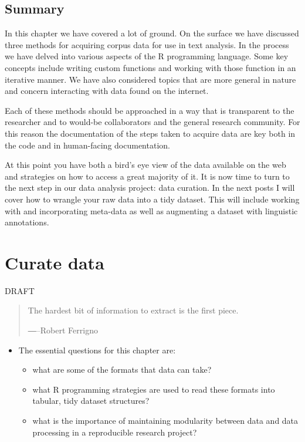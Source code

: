 \documentclass[
]{article}
\providecommand{\tightlist}{%
  \setlength{\itemsep}{0pt}\setlength{\parskip}{0pt}}
\newenvironment{rmdblock}[1]
  {\begin{shaded*}
  \begin{itemize}
  \renewcommand{\labelitemi}{
    \raisebox{-.5\height}[0pt][0pt]{
      {\setkeys{Gin}{width=2em,keepaspectratio}\texttt{[image: assets/images/\#1]}}
    }
  }
  \item
  }
  {
  \end{itemize}
  \end{shaded*}
  }
\newenvironment{rmdkey}
  {\begin{rmdblock}{key}}
  {\end{rmdblock}}
\begin{document}
\hypertarget{summary-4}{%
\subsection*{Summary}\label{summary-4}}

In this chapter we have covered a lot of ground. On the surface we have discussed three methods for acquiring corpus data for use in text analysis. In the process we have delved into various aspects of the R programming language. Some key concepts include writing custom functions and working with those function in an iterative manner. We have also considered topics that are more general in nature and concern interacting with data found on the internet.

Each of these methods should be approached in a way that is transparent to the researcher and to would-be collaborators and the general research community. For this reason the documentation of the steps taken to acquire data are key both in the code and in human-facing documentation.

At this point you have both a bird's eye view of the data available on the web and strategies on how to access a great majority of it. It is now time to turn to the next step in our data analysis project: data curation. In the next posts I will cover how to wrangle your raw data into a tidy dataset. This will include working with and incorporating meta-data as well as augmenting a dataset with linguistic annotations.

\hypertarget{curate-data}{%
\section{Curate data}\label{curate-data}}

DRAFT

\begin{quote}
The hardest bit of information to extract is the first piece.

―--Robert Ferrigno
\end{quote}

\begin{rmdkey}
The essential questions for this chapter are:

\begin{itemize}
\tightlist
\item
  what are some of the formats that data can take?
\item
  what R programming strategies are used to read these formats into
  tabular, tidy dataset structures?
\item
  what is the importance of maintaining modularity between data and data
  processing in a reproducible research project?
\end{itemize}
\end{rmdkey}
\end{document}
